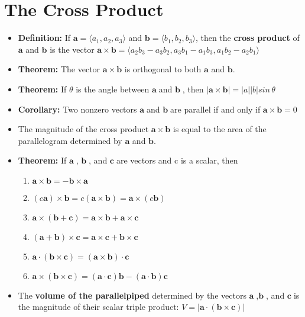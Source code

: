\documentclass{report}
\newcommand{\va}{$\mathbf{a}\;$}
\newcommand{\vb}{$\mathbf{b}\;$}
\newcommand{\vc}{$\mathbf{c}\;$}
\begin{document}
	\section{The Cross Product}
		\begin{itemize}\addtolength{\leftskip}{2em}
			 \large\item \textbf{Definition:} If $\mathbf{a}= \langle a_1,a_2,a_3 \rangle$ and $\mathbf{b}=\langle b_1,b_2,b_3 \rangle$, then the \textbf{cross product} of $\mathbf{a}$ and $\mathbf{b}$ is the vector
					\Large\subitem $\mathbf{a}\times \mathbf{b}=\langle a_2b_3-a_3b_2,a_3b_1-a_1b_3,a_1b_2-a_2b_1 \rangle$
			\large\item \textbf{Theorem: }The vector $\mathbf{a}\times \mathbf{b}$ is orthogonal to both $\mathbf{a}$ and $\mathbf{b}$.
			\large\item \textbf{Theorem: }If $\theta$ is the angle between \va and \vb, then
			\subitem \Large$|\mathbf{a}\times \mathbf{b}|=|a||b|sin\,\theta$
			\large\item \textbf{Corollary: }Two nonzero vectors \va and \vb are parallel if and only if
				\subitem \Large$\mathbf{a}\times\mathbf{b}=0$
			 \large\item The magnitude of the cross product $\mathbf{a}\times\mathbf{b}$ is equal to the area of the parallelogram determined by $\mathbf{a}$ and $\mathbf{b}$.
			\item \textbf{Theorem:} If \va, \vb, and \vc are vectors and c is a scalar, then
			\begin{enumerate}\addtolength{\leftskip}{4em}
				\item $\mathbf{a}\times\mathbf{b}=-\mathbf{b}\times\mathbf{a}$
				\item $(c\mathbf{a})\times\mathbf{b}=c(\mathbf{a}\times\mathbf{b})=\mathbf{a}\times(c\mathbf{b})$
				\item $\mathbf{a}\times(\mathbf{b}+\mathbf{c})=\mathbf{a}\times\mathbf{b}+\mathbf{a}\times\mathbf{c}$
				\item $(\mathbf{a}+\mathbf{b})\times\mathbf{c}=\mathbf{a}\times\mathbf{c}+\mathbf{b}\times\mathbf{c}$
				\item $\mathbf{a}\cdot(\mathbf{b}\times\mathbf{c})=(\mathbf{a}\times\mathbf{b})\cdot\mathbf{c}$
				\item $\mathbf{a}\times(\mathbf{b}\times\mathbf{c})=(\mathbf{a}\cdot\mathbf{c})\mathbf{b}-(\mathbf{a}\cdot\mathbf{b})\mathbf{c}$
			\end{enumerate}
			\item \large The \textbf{volume of the parallelpiped} determined by the vectors \va,\vb, and \vc is the magnitude of their scalar triple product:
				\subitem \Large $V=|\mathbf{a}\cdot(\mathbf{b}\times\mathbf{c})|$
		\end{itemize}
\end{document}
